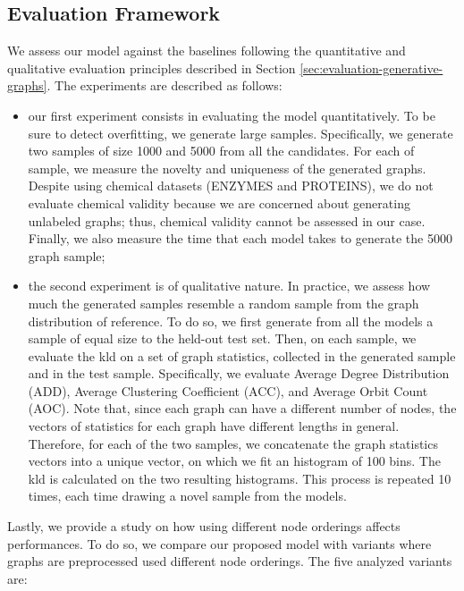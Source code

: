 \subsection{Evaluation Framework}
We assess our model against the baselines following the quantitative and qualitative evaluation principles described in Section \ref{sec:evaluation-generative-graphs}. The experiments are described as follows:
\begin{itemize}
    \item our first experiment consists in evaluating the model quantitatively. To be sure to detect overfitting, we generate large samples. Specifically, we generate two samples of size 1000 and 5000 from all the candidates. For each of sample, we measure the novelty and uniqueness of the generated graphs. Despite using chemical datasets (ENZYMES and PROTEINS), we do not evaluate chemical validity because we are concerned about generating unlabeled graphs; thus, chemical validity cannot be assessed in our case. Finally, we also measure the time that each model takes to generate the 5000 graph sample;
    \item the second experiment is of qualitative nature. In practice, we assess how much the generated samples resemble a random sample from the graph distribution of reference. To do so, we first generate from all the models a sample of equal size to the held-out test set. Then, on each sample, we evaluate the \gls{kld} on a set of graph statistics, collected in the generated sample and in the test sample. Specifically, we evaluate Average Degree Distribution (ADD), Average Clustering Coefficient (ACC), and Average Orbit Count (AOC). Note that, since each graph can have a different number of nodes, the vectors of statistics for each graph have different lengths in general. Therefore, for each of the two samples, we concatenate the graph statistics vectors into a unique vector, on which we fit an histogram of 100 bins. The \gls{kld} is calculated on the two resulting histograms. This process is repeated 10 times, each time drawing a novel sample from the models.
\end{itemize}
Lastly, we provide a study on how using different node orderings affects performances. To do so, we compare our proposed model with variants where graphs are preprocessed used different node orderings. The five analyzed variants are:
